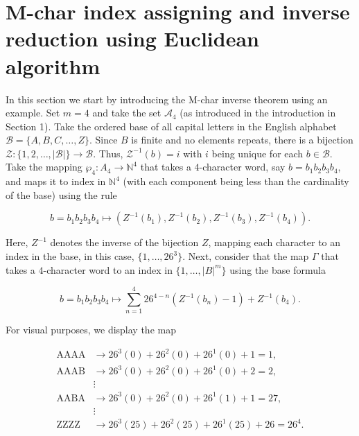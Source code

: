 \documentclass[amsmath,12pt,a4paper]{amsart}
\begin{document}
 
 \section{M-char index assigning and inverse reduction using Euclidean algorithm}
In this section we start by introducing the M-char inverse theorem using an example. Set $m = 4$ and take the set $\mathcal{A}_4$ (as introduced in the introduction in Section 1). Take the ordered base of all capital letters in the English alphabet $ \mathcal{B} = \{ A, B, C, \ldots, Z \}.$ Since $ B$ is finite and no elements repeats, there is a bijection $ \mathcal{Z} : \{1, 2, \ldots, |\mathcal{B}|\} \to \mathcal{B} $. Thus, $ \mathcal{Z}^{-1}(b) = i $ with $ i$ being unique for each $ b \in \mathcal{B} $. Take the mapping $
\wp_4 : A_4 \to \mathbb{N}^4
$ that takes a $4$-character word, say $ b = b_1 b_2 b_3 b_4 $, and maps it to index in $\mathbb{N}^4$ (with each component being less than the cardinality of the base) using the rule


\begin{equation}\label{Eq27}
b = b_1 b_2 b_3 b_4 \mapsto \left(Z^{-1}(b_1), Z^{-1}(b_2), Z^{-1}(b_3), Z^{-1}(b_4)\right).
\end{equation}

Here, $ Z^{-1} $ denotes the inverse of the bijection \( Z \), mapping each character to an index in the base, in this case, $ \{1, \ldots, 26^3\} $. Next, consider that the map $\Gamma$ that takes a $4$-character word to an index in $ \{1, \ldots, |B|^m\} $ using the base formula


\begin{equation}\label{Eq28}
b = b_1 b_2 b_3 b_4 \mapsto \sum_{n=1}^{4} 26^{4-n} \left(Z^{-1}(b_n) - 1\right) + Z^{-1}(b_4).
\end{equation}

For visual purposes, we display the map

\begin{equation}\label{Eq29}
\begin{aligned}
\text{AAAA} &\to 26^3(0) + 26^2(0) + 26^1(0) + 1 = 1, \\
\text{AAAB} &\to 26^3(0) + 26^2(0) + 26^1(0) + 2 = 2, \\
&\vdots \\
\text{AABA} &\to 26^3(0) + 26^2(0) + 26^1(1) + 1 = 27, \\
&\vdots \\
\text{ZZZZ} &\to 26^3(25) + 26^2(25) + 26^1(25) + 26 = 26^4.
\end{aligned}
\end{equation}
\end{document}
